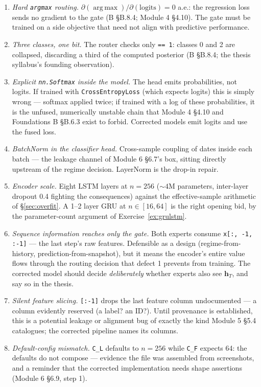 \documentclass[11pt]{article}
\numberwithin{equation}{section}
\theoremstyle{plain}
\theoremstyle{definition}
\theoremstyle{remark}
\DeclareMathOperator*{\argmax}{arg\,max}
\newcommand{\bh}{\bm{h}}
\begin{document}
\begin{enumerate}[leftmargin=2em,itemsep=0.2em]
\item \emph{Hard \texttt{argmax} routing.} $\partial(\argmax)/\partial(\text{logits}) = 0$ a.e.: the regression loss sends no gradient to the gate (B \S B.8.4; Module 4 \S4.10). The gate must be trained on a side objective that need not align with predictive performance.
\item \emph{Three classes, one bit.} The router checks only \texttt{== 1}: classes 0 and 2 are collapsed, discarding a third of the computed posterior (B \S B.8.4; the thesis syllabus's founding observation).
\item \emph{Explicit \texttt{nn.Softmax} inside the model.} The head emits probabilities, not logits. If trained with \texttt{CrossEntropyLoss} (which expects logits) this is simply wrong --- softmax applied twice; if trained with a log of these probabilities, it is the unfused, numerically unstable chain that Module 4 \S4.10 and Foundations B \S B.6.3 exist to forbid. Corrected models emit logits and use the fused loss.
\item \emph{BatchNorm in the classifier head.} Cross-sample coupling of dates inside each batch --- the leakage channel of Module 6 \S6.7's box, sitting directly upstream of the regime decision. LayerNorm is the drop-in repair.
\item \emph{Encoder scale.} Eight LSTM layers at $n = 256$ ($\sim 4$M parameters, inter-layer dropout 0.4 fighting the consequences) against the effective-sample arithmetic of \S\ref{sec:overfit}. A 1--2 layer GRU at $n \in [16, 64]$ is the right opening bid, by the parameter-count argument of Exercise~\ref{ex:grulstm}.
\item \emph{Sequence information reaches only the gate.} Both experts consume \texttt{x[:, -1, :-1]} --- the last step's raw features. Defensible as a design (regime-from-history, prediction-from-snapshot), but it means the encoder's entire value flows through the routing decision that defect 1 prevents from training. The corrected model should decide \emph{deliberately} whether experts also see $\bh_T$, and say so in the thesis.
\item \emph{Silent feature slicing.} \texttt{[:-1]} drops the last feature column undocumented --- a column evidently reserved (a label? an ID?). Until provenance is established, this is a potential leakage or alignment bug of exactly the kind Module 5 \S5.4 catalogues; the corrected pipeline names its columns.
\item \emph{Default-config mismatch.} \texttt{C\_L} defaults to $n = 256$ while \texttt{C\_F} expects 64: the defaults do not compose --- evidence the file was assembled from screenshots, and a reminder that the corrected implementation needs shape assertions (Module 6 \S6.9, step 1).
\end{enumerate}
\end{document}
